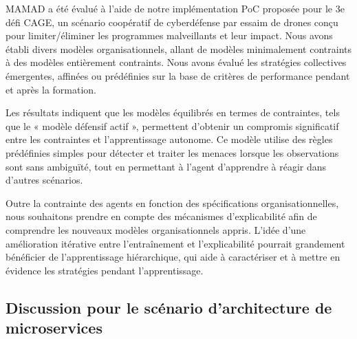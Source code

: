 MAMAD a été évalué à l'aide de notre implémentation PoC proposée pour le 3e défi CAGE, un scénario coopératif de cyberdéfense par essaim de drones conçu pour limiter/éliminer les programmes malveillants et leur impact. Nous avons établi divers modèles organisationnels, allant de modèles minimalement contraints à des modèles entièrement contraints. Nous avons évalué les stratégies collectives émergentes, affinées ou prédéfinies sur la base de critères de performance pendant et après la formation.

Les résultats indiquent que les modèles équilibrés en termes de contraintes, tels que le « modèle défensif actif », permettent d'obtenir un compromis significatif entre les contraintes et l'apprentissage autonome. Ce modèle utilise des règles prédéfinies simples pour détecter et traiter les menaces lorsque les observations sont sans ambiguïté, tout en permettant à l'agent d'apprendre à réagir dans d'autres scénarios.

Outre la contrainte des agents en fonction des spécifications organisationnelles, nous souhaitons prendre en compte des mécanismes d'explicabilité afin de comprendre les nouveaux modèles organisationnels appris. L'idée d'une amélioration itérative entre l'entraînement et l'explicabilité pourrait grandement bénéficier de l'apprentissage hiérarchique, qui aide à caractériser et à mettre en évidence les stratégies pendant l'apprentissage.



\subsection{Discussion pour le scénario d'architecture de microservices}
\label{sec:conclusion}


